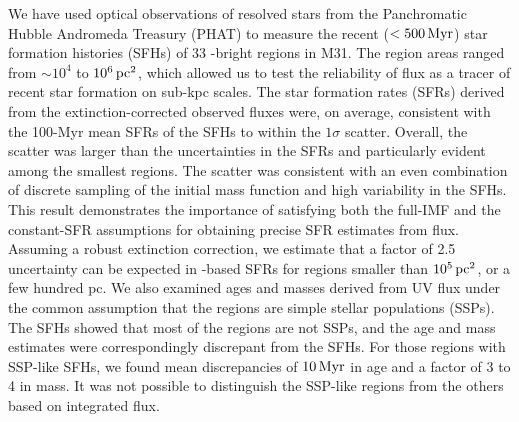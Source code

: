 We have used optical observations of resolved stars from the Panchromatic
Hubble Andromeda Treasury (PHAT) to measure the recent ($< 500\,\mathrm{Myr}$) star
formation histories (SFHs) of 33 \fuv{}-bright regions in M31. The region areas
ranged from $\sim 10^4$ to $10^6\,\mathrm{pc}^2$, which allowed us to test the
reliability of \fuv{} flux as a tracer of recent star formation on sub-kpc
scales. The star formation rates (SFRs) derived from the extinction-corrected
observed \fuv{} fluxes were, on average, consistent with the 100-Myr mean SFRs
of the SFHs to within the $1\sigma$ scatter. Overall, the scatter was larger
than the uncertainties in the SFRs and particularly evident among the smallest
regions. The scatter was consistent with an even combination of discrete
sampling of the initial mass function and high variability in the SFHs. This
result demonstrates the importance of satisfying both the full-IMF and the
constant-SFR assumptions for obtaining precise SFR estimates from \fuv{} flux.
Assuming a robust \fuv{} extinction correction, we estimate that a factor of
2.5 uncertainty can be expected in \fuv{}-based SFRs for regions smaller than
$10^5\,\mathrm{pc}^2$, or a few hundred pc. We also examined ages and masses derived from
UV flux under the common assumption that the regions are simple stellar
populations (SSPs). The SFHs showed that most of the regions are not SSPs, and
the age and mass estimates were correspondingly discrepant from the SFHs. For
those regions with SSP-like SFHs, we found mean discrepancies of $10\,\mathrm{Myr}$ in
age and a factor of 3 to 4 in mass. It was not possible to distinguish the
SSP-like regions from the others based on integrated \fuv{} flux.

